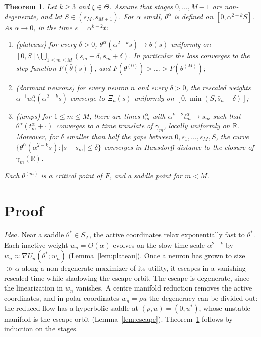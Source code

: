 \documentclass[11pt]{article}
\newtheorem{maintheorem}{Theorem}
\theoremstyle{definition}
\theoremstyle{remark}
\newcommand{\R}{\mathbb{R}}
\newcommand{\sm}{\setminus}
\begin{document}
\begin{maintheorem}\label{thm:main}
Let $k\ge3$ and $\xi\in\Theta$. Assume that stages $0,\dots,M-1$ are non-degenerate, and let $S\in(s_M,s_{M+1})$. For $\alpha$ small, $\theta^\alpha$ is defined on $[0,\alpha^{2-k}S]$. As $\alpha\to0$, in the time $s=\alpha^{k-2}t$:
\begin{enumerate}[label=\textup{(\roman*)},nosep]
\item \emph{(plateaus)} for every $\delta>0$, $\theta^\alpha(\alpha^{2-k}s)\to\bar\theta(s)$ uniformly on $[0,S]\sm\bigcup_{1\le m\le M}(s_m-\delta,s_m+\delta)$. In particular the loss converges to the step function $F(\bar\theta(s))$, and $F(\theta^{(0)})>\dots>F(\theta^{(M)})$;
\item \emph{(dormant neurons)} for every neuron $n$ and every $\delta>0$, the rescaled weights $\alpha^{-1}w^\alpha_n(\alpha^{2-k}s)$ converge to $\Xi_n(s)$ uniformly on $[0,\min(S,\bar s_n-\delta)]$;
\item \emph{(jumps)} for $1\le m\le M$, there are times $t^\alpha_m$ with $\alpha^{k-2}t^\alpha_m\to s_m$ such that $\theta^\alpha(t^\alpha_m+\cdot)$ converges to a time translate of $\gamma_m$, locally uniformly on $\R$. Moreover, for $\delta$ smaller than half the gaps between $0,s_1,\dots,s_M,S$, the curve $\{\theta^\alpha(\alpha^{2-k}s):|s-s_m|\le\delta\}$ converges in Hausdorff distance to the closure of $\gamma_m(\R)$.
\end{enumerate}
Each $\theta^{(m)}$ is a critical point of $F$, and a saddle point for $m<M$.
\end{maintheorem}

\section{Proof}

\emph{Idea.} Near a saddle $\theta^*\in S_A$, the active coordinates relax exponentially fast to $\theta^*$. Each inactive weight $w_n=O(\alpha)$ evolves on the slow time scale $\alpha^{2-k}$ by $\dot w_n\approx\nabla U_n(\theta^*;w_n)$ (Lemma~\ref{lem:plateau}). Once a neuron has grown to size $\gg\alpha$ along a non-degenerate maximizer of its utility, it escapes in a vanishing rescaled time while shadowing the escape orbit. The escape is degenerate, since the linearization in $w_n$ vanishes. A centre manifold reduction removes the active coordinates, and in polar coordinates $w_n=\rho u$ the degeneracy can be divided out: the reduced flow has a hyperbolic saddle at $(\rho,u)=(0,u^*)$, whose unstable manifold is the escape orbit (Lemma~\ref{lem:escape}). Theorem~\ref{thm:main} follows by induction on the stages.
\end{document}

